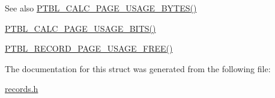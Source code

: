 \begin{DoxySeeAlso}{See also}
\mbox{\hyperlink{records_8h_a1cd95048f707ae0b6b39835a9a375f80}{P\+T\+B\+L\+\_\+\+C\+A\+L\+C\+\_\+\+P\+A\+G\+E\+\_\+\+U\+S\+A\+G\+E\+\_\+\+B\+Y\+T\+E\+S()}} 

\mbox{\hyperlink{records_8h_a46f2b82d234b9778310024626d19fb03}{P\+T\+B\+L\+\_\+\+C\+A\+L\+C\+\_\+\+P\+A\+G\+E\+\_\+\+U\+S\+A\+G\+E\+\_\+\+B\+I\+T\+S()}} 

\mbox{\hyperlink{records_8h_ab1ba341a9a6bebf5f1c883876fe6943a}{P\+T\+B\+L\+\_\+\+R\+E\+C\+O\+R\+D\+\_\+\+P\+A\+G\+E\+\_\+\+U\+S\+A\+G\+E\+\_\+\+F\+R\+E\+E()}} 
\end{DoxySeeAlso}


The documentation for this struct was generated from the following file\+:\begin{DoxyCompactItemize}
\item 
\mbox{\hyperlink{records_8h}{records.\+h}}\end{DoxyCompactItemize}
